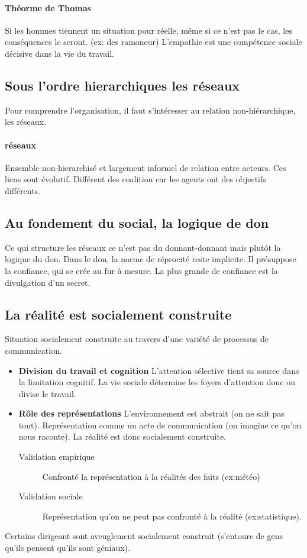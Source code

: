 \documentclass[11pt]{article} %
\begin{document}
		\paragraph{Théorme de Thomas} Si les hommes tiennent un situation pour réelle, même si ce n'est
		pas le cas, les conséquences le seront.  (ex: des ramoneur)
		L'empathie est une compétence sociale décisive dans la vie du travail.
	\subsection{Sous l'ordre hierarchiques les réseaux}
		Pour comprendre l'organisation, il faut s'intéresser au relation non-hiérarchique, les réseaux.
		\paragraph{réseaux} Ensemble non-hierarchisé et largement informel de relation entre acteurs. Ces 
		liens sont évolutif. Différent des coalition car les agents ont des objectifs différents.
	\subsection{Au fondement du social, la logique de don}
		Ce qui structure les réseaux ce n'est pas du donnant-donnant mais plutôt la logique du don. Dans le
		don, la norme de réprocité reste implicite. Il présuppose la confiance, qui se crée au fur à mesure. La 
		plus grande de confiance est la divulgation d'un secret.
	\subsection{La réalité est socialement construite}
		Situation socialement construite au travers d'une variété de processus de communication. 
		\begin{itemize}
			\item \textbf{Division du travail et cognition} L'attention sélective tient sa source dans la limitation
			cognitif. La vie sociale détermine les foyers d'attention donc on divise le travail.
			\item \textbf{Rôle des représentations} L'environnement est abstrait (on ne sait pas tout). 
			Représentation comme un acte de  communication (on imagine ce qu'on nous raconte). La réalité 
			est donc socialement construite.
			\begin{description}
				\item[Validation empirique] Confronté la représentation à la réalités des faits (ex:météo)
				\item[Validation sociale] Représentation qu'on ne peut pas confronté à la réalité 		
				(ex:statistique).
			\end{description}
		\end{itemize}
		Certains dirigeant sont aveuglement socialement construit (s'entoure de gens qu'ils pensent qu'ils sont 	
		géniaux).
\end{document}
